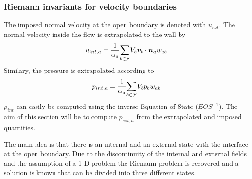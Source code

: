 \subsubsection{Riemann invariants for velocity boundaries}
\label{h:open:vel}
The imposed normal velocity at the open boundary is denoted with
$u_{ext}$. The normal velocity inside the flow is extrapolated to the wall
by
\begin{equation}
u_{int,a} = \frac{1}{\alpha_a}\underset{b \in \mathcal{F}}{\sum} V_b \bm{v}_b \cdot \bm{n}_a
w_{ab}
\label{e:open:uint}
\end{equation}
Similary, the pressure is extrapolated according to
\begin{equation}
p_{int,a} = \frac{1}{\alpha_a}\underset{b \in \mathcal{F}}{\sum} V_b p_b w_{ab}
\label{e:open:pint}
\end{equation}
$\rho_{int}$ can easily be computed using the inverse Equation of State
($EOS^{-1}$). The aim of this section will be to compute $p_{ext,a}$
from the extrapolated and imposed quantities.

The main idea is that there is an internal and an external state with
the interface at the open boundary. Due to the discontinuity of the
internal and external fields and the assumption of a 1-D problem the
Riemann problem is recovered and a solution is known that can be divided
into three different states.


